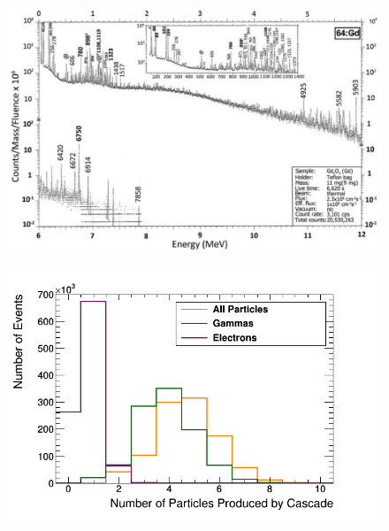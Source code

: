 

\begin{figure}[htbp]
 \centering
 \includegraphics[width=0.7\linewidth]{Chapter4/Figs/Raster/gadolinium/naturalGd.png}
 \label{fig:naturalGd.png}
\end{figure}

\begin{figure}[htbp]
 \centering
 \includegraphics[width=0.7\linewidth]{Chapter4/Figs/Raster/gadolinium/gadoliniumMultipliciesBreakdownCascade.png}
 \label{fig:gadoliniumMultipliciesBreakdownCascade}
\end{figure}

